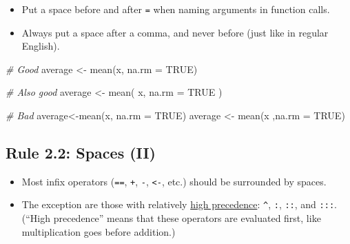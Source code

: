 \documentclass[
  letterpaper,
  DIV=11,
  numbers=noendperiod]{scrreprt}
\newenvironment{Shaded}{\begin{snugshade}}{\end{snugshade}}
\newcommand{\AttributeTok}[1]{\textcolor[rgb]{0.49,0.56,0.16}{#1}}
\newcommand{\CommentTok}[1]{\textcolor[rgb]{0.38,0.63,0.69}{\textit{#1}}}
\newcommand{\ConstantTok}[1]{\textcolor[rgb]{0.53,0.00,0.00}{#1}}
\newcommand{\FunctionTok}[1]{\textcolor[rgb]{0.02,0.16,0.49}{#1}}
\newcommand{\NormalTok}[1]{\textcolor[rgb]{0.00,0.44,0.13}{#1}}
\newcommand{\OtherTok}[1]{\textcolor[rgb]{0.00,0.44,0.13}{#1}}
\providecommand{\tightlist}{%
  \setlength{\itemsep}{0pt}\setlength{\parskip}{0pt}}\usepackage{longtable,booktabs,array}
\begin{document}
\begin{itemize}
\tightlist
\item
  Put a space before and after \texttt{=} when naming arguments in
  function calls.
\item
  Always put a space after a comma, and never before (just like in
  regular English).
\end{itemize}

\begin{Shaded}
\begin{Highlighting}[]
\CommentTok{\# Good}
\NormalTok{average }\OtherTok{\textless{}{-}} \FunctionTok{mean}\NormalTok{(x, }\AttributeTok{na.rm =} \ConstantTok{TRUE}\NormalTok{)}

\CommentTok{\# Also good}
\NormalTok{average }\OtherTok{\textless{}{-}} \FunctionTok{mean}\NormalTok{( x, }\AttributeTok{na.rm =} \ConstantTok{TRUE}\NormalTok{ )}

\CommentTok{\# Bad}
\NormalTok{average}\OtherTok{\textless{}{-}}\FunctionTok{mean}\NormalTok{(x, }\AttributeTok{na.rm =} \ConstantTok{TRUE}\NormalTok{)}
\NormalTok{average }\OtherTok{\textless{}{-}} \FunctionTok{mean}\NormalTok{(x ,}\AttributeTok{na.rm =} \ConstantTok{TRUE}\NormalTok{)}
\end{Highlighting}
\end{Shaded}

\hypertarget{rule-2.2-spaces-ii}{%
\subsection{Rule 2.2: Spaces (II)}\label{rule-2.2-spaces-ii}}

\begin{itemize}
\tightlist
\item
  Most infix operators (\texttt{==}, \texttt{+}, \texttt{-},
  \texttt{\textless{}-}, etc.) should be surrounded by spaces.
\item
  The exception are those with relatively
  \href{http://stat.ethz.ch/R-manual/R-patched/library/base/html/Syntax.html}{high
  precedence}: \texttt{\^{}}, \texttt{:}, \texttt{::}, and \texttt{:::}.
  (``High precedence'' means that these operators are evaluated first,
  like multiplication goes before addition.)
\end{itemize}
\end{document}
